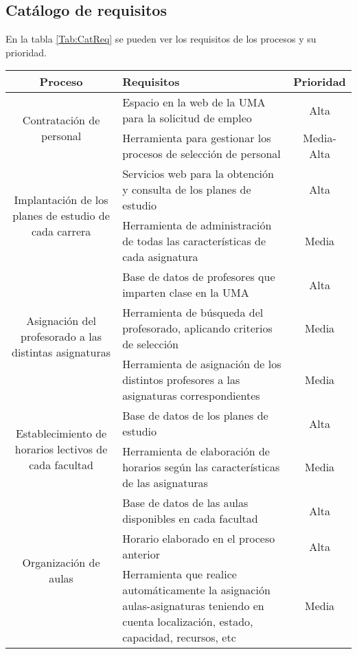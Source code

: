 \documentclass[11pt,a4paper,spanish,twoside]{report}
\begin{document}
\subsection{Catálogo de requisitos} \label{ss:4.3.1}
En la tabla \ref{Tab:CatReq} se pueden ver los requisitos de los procesos y
su prioridad.

\begin{table}[!h]
\centering
\small
  \begin{tabular}{c|p{5cm}|c}
    \textbf{Proceso} & \textbf{Requisitos} & \textbf{Prioridad} \\
    \hline \hline
    \multirow{2}{4cm}{Contratación de personal}
    & Espacio en la web de la UMA para la solicitud de empleo & Alta \\
    \cline{2-3}
    & Herramienta para gestionar los procesos de selección de personal &
    Media-Alta\\ \hline

    \multirow{2}{4cm}{Implantación de los planes de estudio de cada
      carrera}
    & Servicios web para la obtención y consulta de los planes de estudio &
    Alta\\ \cline{2-3}
    & Herramienta de administración de todas las características de cada
    asignatura & Media\\  \hline

    \multirow{3}{4cm}{Asignación del profesorado a las distintas asignaturas}
    & Base de datos de profesores que imparten clase en la UMA & Alta \\ 
    \cline{2-3}
    & Herramienta de búsqueda del profesorado, aplicando criterios de selección
    & Media\\ \cline{2-3}
    & Herramienta de asignación de los distintos profesores a las
    asignaturas correspondientes & Media\\ \hline
     
    \multirow{2}{4cm}{Establecimiento de horarios lectivos de cada facultad}
    & Base de datos de los planes de estudio & Alta\\ \cline{2-3}
    & Herramienta de elaboración de horarios según las características de
    las asignaturas & Media \\ \hline
    
    \multirow{3}{4cm}{Organización de aulas}
    & Base de datos de las aulas disponibles en cada facultad & Alta\\
    \cline{2-3}
    & Horario elaborado en el proceso anterior & Alta \\
    \cline{2-3}
    & Herramienta que realice automáticamente la asignación
    aulas-asignaturas teniendo en cuenta localización, estado, capacidad,
    recursos, etc & Media \\ \hline
    

\end{tabular}
\end{table}
\end{document}
